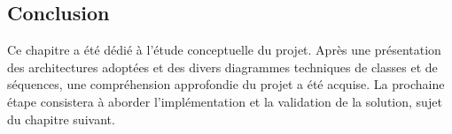 \subsection*{Conclusion}

Ce chapitre a été dédié à l’étude conceptuelle du projet. Après une présentation des architectures adoptées et des divers diagrammes techniques de classes et de séquences, une compréhension approfondie du projet a été acquise. La prochaine étape consistera à aborder l’implémentation et la validation de la solution, sujet du chapitre suivant.
\pagebreak